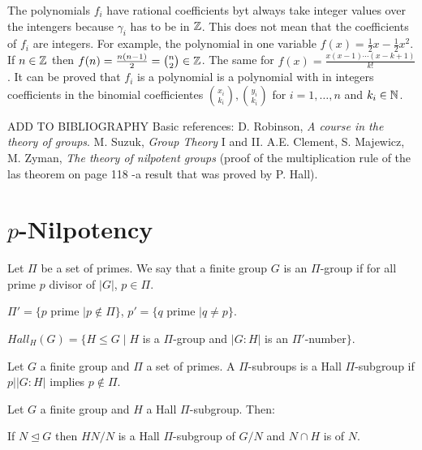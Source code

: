 \documentclass[twoside, 11pt]{article}
\begin{document}
\begin{nota}
The polynomials $f_i$ have rational coefficients byt always take integer values over the intengers because $\gamma_i$ has to be in $\mathbb{Z}$. This does not mean that the coefficients of $f_i$ are integers. For example, the polynomial in one variable $f(x)=\frac{1}{2}x-\frac{1}{2}x^2$. If $n\in\mathbb{Z}$ then $f(n)=\frac{n(n-1)}{2}=\binom{n}{2}\in\mathbb{Z}$. The same for $f(x)=\frac{x(x-1)\cdots (x-k+1)}{k!}$. It can be proved that $f_i$ is a polynomial is a polynomial with in integers coefficients in the binomial coefficientes $\binom{x_i}{k_i}, \binom{y_i}{k_i}$ for $i=1,\dots, n$ and $k_i\in\mathbb{N}$. 
\end{nota}


ADD TO BIBLIOGRAPHY
Basic references: D. Robinson, \emph{A course in the theory of groups}. M. Suzuk, \emph{Group Theory} I and II. A.E. Clement, S. Majewicz, M. Zyman, \emph{The theory of nilpotent groups} (proof of the multiplication rule of the las theorem on page 118 -a result that was proved by P. Hall).

\section{$p$-Nilpotency}

\begin{defi}
Let $\Pi$ be a set of primes. We say that a finite group $G$ is an $\Pi$-group if for all prime $p$ divisor of $|G|$, $p\in \Pi$. 
\end{defi}

\begin{defi}
$\Pi'=\{p$ prime $\mid p\notin \Pi\}$, $p'=\{q$ prime $\mid q\neq p\}$. 
\end{defi}

\begin{defi}
$Hall_H(G)=\{H\leq G\mid H$ is a $\Pi$-group and $|G:H|$ is an $\Pi'$-number$\}$.
\end{defi}

\begin{defi}
Let $G$ a finite group and $\Pi$ a set of primes. A $\Pi$-subroups is a Hall $\Pi$-subgroup if $p||G:H|$ implies $p\notin \Pi$. 
\end{defi}

\begin{prop}
Let $G$ a finite group and $H$ a Hall $\Pi$-subgroup. Then:

 If $N\trianglelefteq G$ then $HN/N$ is a Hall $\Pi$-subgroup of $G/N$ and $N\cap H$ is of $N$.

\end{prop}
\end{document}
